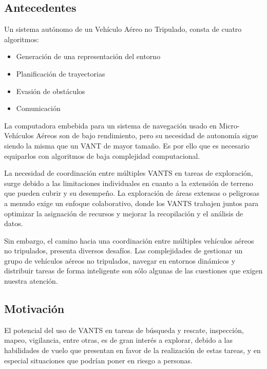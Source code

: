 \subsection*{Antecedentes}

Un sistema autónomo de un Vehículo Aéreo no Tripulado, consta de cuatro algoritmos:
\begin{itemize}\setlength{\itemsep}{-1mm}
\item Generación de una representación del entorno
\item Planificación de trayectorias
\item Evasión de obstáculos
\item Comunicación
\end{itemize}

La computadora embebida para un sistema de navegación usado en Micro-Vehículos Aéreos son de bajo rendimiento, pero su necesidad de autonomía sigue siendo la misma que un VANT de mayor tamaño. Es por ello que es necesario equiparlos con algoritmos de baja complejidad computacional.

La necesidad de coordinación entre múltiples VANTS en tareas de exploración, surge debido a las limitaciones individuales en cuanto a la extensión de terreno que pueden cubrir y su desempeño. La exploración de áreas extensas o peligrosas a menudo exige un enfoque colaborativo, donde los VANTS trabajen juntos para optimizar la asignación de recursos y mejorar la recopilación y el análisis de datos.

Sin embargo, el camino hacia una coordinación entre múltiples vehículos aéreos no tripulados, presenta diversos desafíos. Las complejidades de gestionar un grupo de vehículos aéreos no tripulados, navegar en entornos dinámicos y distribuir tareas de forma inteligente son sólo algunas de las cuestiones que exigen nuestra atención. %

\subsection*{Motivación}

El potencial del uso de VANTS en tareas de búsqueda y rescate, inspección, mapeo, vigilancia, entre otras, es de gran interés a explorar, debido a las habilidades de vuelo que presentan en favor de la realización de estas tareas, y en especial situaciones que podrían poner en riesgo a personas.

